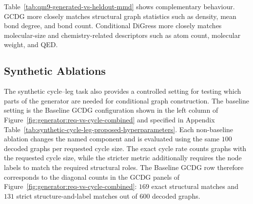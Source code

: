 Table~\ref{tab:qm9-generated-vs-heldout-mmd} shows complementary behaviour.
GCDG more closely matches structural graph statistics such as
density, mean bond degree, and bond count. Conditional DiGress more closely matches
molecular-size and chemistry-related descriptors such as atom count, molecular
weight, and QED.

\subsection{Synthetic Ablations}
\label{sec:generator:synthetic-ablations}

The synthetic cycle--leg task also provides a controlled setting for testing
which parts of the generator are needed for conditional graph construction. The
baseline setting is the Baseline GCDG configuration shown in the left column of
Figure~\ref{fig:generator:req-vs-cycle-combined} and specified in
Appendix Table~\ref{tab:synthetic-cycle-leg-proposed-hyperparameters}. Each
non-baseline ablation changes the named component and is evaluated using the
same \(100\) decoded graphs per requested cycle size. The exact cycle rate
counts graphs with the requested cycle size, while the stricter metric
additionally requires the node labels to match the required structural roles.
The Baseline GCDG row therefore corresponds to
the diagonal counts in the GCDG panels of
Figure~\ref{fig:generator:req-vs-cycle-combined}: \(169\) exact structural
matches and \(131\) strict structure-and-label matches out of \(600\) decoded
graphs.

